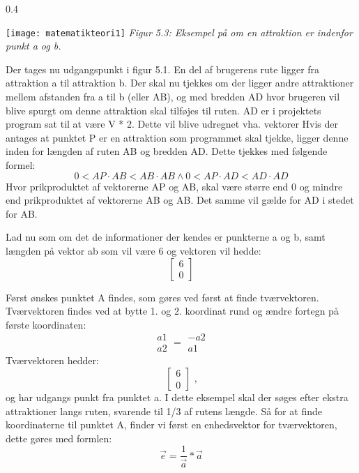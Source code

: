 \begin{wrapfigure}{}{0.4\textwidth}
	\vspace{-10pt}
	\begin{center}
		\texttt{[image: matematikteori1]} \newline
		\textit{Figur 5.3: Eksempel på om en attraktion er indenfor punkt a og b.}\newline
	\end{center}
	\vspace{-20pt}
\end{wrapfigure}

Der tages nu udgangspunkt i figur 5.1. En del af brugerens rute ligger fra attraktion a til attraktion b. Der skal nu tjekkes om der ligger andre attraktioner mellem afstanden fra a til b (eller AB), og med bredden AD hvor brugeren vil blive spurgt om denne attraktion skal tilføjes til ruten. AD er i projektets program sat til at være V * 2. Dette vil blive udregnet vha. vektorer 
Hvis der antages at punktet P er en attraktion som programmet skal tjekke, ligger denne inden for længden af ruten AB og bredden AD. Dette tjekkes med følgende formel:
\[0 < AP \cdot AB < AB \cdot AB \wedge 0 < AP \cdot AD < AD \cdot AD \]
Hvor prikproduktet af vektorerne AP og AB, skal være større end 0 og mindre end prikproduktet af vektorerne AB og AB. Det samme vil gælde for AD i stedet for AB.

Lad nu som om det de informationer der kendes er punkterne a og b, samt længden på vektor ab som vil være 6 og vektoren vil hedde:
\[ \begin{bmatrix} 6 \\ 0 \end{bmatrix} \]

Først ønskes punktet A findes, som gøres ved først at finde tværvektoren. Tværvektoren findes ved at bytte 1. og 2. koordinat rund og ændre fortegn på første koordinaten:
\[ \begin{matrix} a1 \\ a2 \end{matrix} = \begin{matrix} -a2 \\ a1 \end{matrix} \]
Tværvektoren hedder: 
\[ \begin{bmatrix} 6 \\ 0 \end{bmatrix} \text{ ,} \]
og har udgangs punkt fra punktet a. \newline
I dette eksempel skal der søges efter ekstra attraktioner langs ruten, svarende til 1/3 af rutens længde. Så for at finde koordinaterne til punktet A, finder vi først en enhedsvektor for tværvektoren, dette gøres med formlen:
\[ \overrightarrow{e} = \frac{1}{\overrightarrow{a}}*\overrightarrow{a} \] 

